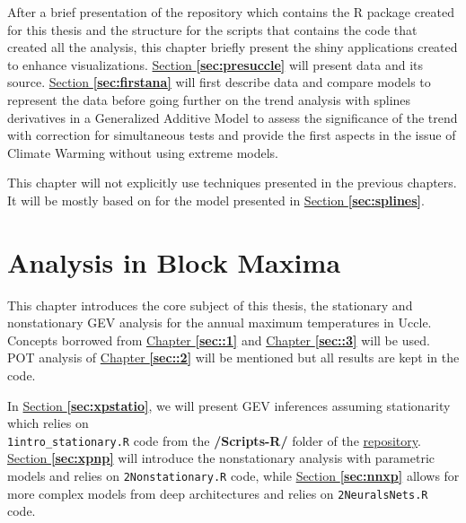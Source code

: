 \documentclass[11pt,a4paper,openany, twosided]{book}
\begin{document}
After a brief presentation of the repository which contains the R package created for this thesis and the structure for the scripts that contains the code that created all the analysis, this chapter briefly present the shiny applications created to enhance visualizations. \hyperref[sec:presuccle]{Section \textbf{\ref{sec:presuccle}}} will present data and its source. \hyperref[sec:firstana]{Section \textbf{\ref{sec:firstana}}} will first describe data and compare models to represent the data before going further on the trend analysis with splines derivatives in a Generalized Additive Model to assess the significance of the trend with correction for simultaneous tests and provide the first aspects in the issue of Climate Warming without using extreme models. 


This chapter will not explicitly use techniques presented in the previous chapters. It will be mostly based on \citet{ruppert_semiparametric_2003} for the model presented in \hyperref[sec:splines]{Section \textbf{\ref{sec:splines}}}. 
  

\newpage




\chapter{Analysis in Block Maxima}\label{sec:anagev}
\minitoc \thispagestyle{empty}
 \vspace{1cm}
 
 This chapter introduces the core subject of this thesis, the stationary and nonstationary GEV analysis for the annual maximum temperatures in Uccle. Concepts borrowed from \hyperref[sec::1]{Chapter \textbf{\ref{sec::1}}} and \hyperref[sec::3]{Chapter \textbf{\ref{sec::3}}} will be used. POT analysis of \hyperref[sec::2]{Chapter \textbf{\ref{sec::2}}} will be mentioned but all results are kept in the code. 

In \hyperref[sec:xpstatio]{Section \textbf{\ref{sec:xpstatio}}}, we will present GEV inferences assuming stationarity which relies on \\ \texttt{1intro\_stationary.R} code from the \textbf{/Scripts-R/} folder of the \href{https://github.com/proto4426/PissoortThesis/}{repository}.
\hyperref[sec:xpnp]{Section \textbf{\ref{sec:xpnp}}} will introduce the nonstationary analysis with parametric models and relies on \texttt{2Nonstationary.R} code, while \hyperref[sec:nnxp]{Section \textbf{\ref{sec:nnxp}}} allows for more complex models from deep architectures and relies on \texttt{2NeuralsNets.R} code. 
\end{document}
